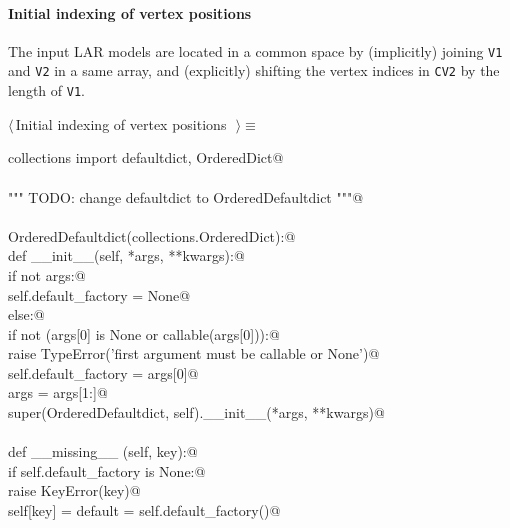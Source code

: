 \documentclass[11pt,oneside]{article}	%
\begin{document}
\paragraph{Initial indexing of vertex positions}
The input LAR models are located in a common space by (implicitly) joining \texttt{V1} and \texttt{V2} in a same array, and (explicitly) shifting the vertex indices in \texttt{CV2} by the length of \texttt{V1}.
\begin{flushleft} \small \label{scrap4}
$\langle\,$Initial indexing of vertex positions\nobreak\ {\footnotesize {}}$\,\rangle\equiv$
\vspace{-1ex}
\begin{list}{}{} \item
\mbox{}\verb@from collections import defaultdict, OrderedDict@\\
\mbox{}\verb@@\\
\mbox{}\verb@""" TODO: change defaultdict to OrderedDefaultdict """@\\
\mbox{}\verb@@\\
\mbox{}\verb@class OrderedDefaultdict(collections.OrderedDict):@\\
\mbox{}\verb@    def __init__(self, *args, **kwargs):@\\
\mbox{}\verb@        if not args:@\\
\mbox{}\verb@            self.default_factory = None@\\
\mbox{}\verb@        else:@\\
\mbox{}\verb@            if not (args[0] is None or callable(args[0])):@\\
\mbox{}\verb@                raise TypeError('first argument must be callable or None')@\\
\mbox{}\verb@            self.default_factory = args[0]@\\
\mbox{}\verb@            args = args[1:]@\\
\mbox{}\verb@        super(OrderedDefaultdict, self).__init__(*args, **kwargs)@\\
\mbox{}\verb@@\\
\mbox{}\verb@    def __missing__ (self, key):@\\
\mbox{}\verb@        if self.default_factory is None:@\\
\mbox{}\verb@            raise KeyError(key)@\\
\mbox{}\verb@        self[key] = default = self.default_factory()@\\

\end{list}
\end{flushleft}
\end{document}
